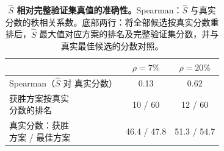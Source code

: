 \begin{table}
\vspace{0pt}
\centering
\caption{\textbf{$\hat{S}$ 相对完整验证集真值的准确性。}Spearman：$\hat{S}$ 与真实分数的秩相关系数。底部两行：将全部候选按真实分数重排后，$\hat{S}$ 最大值对应方案的排名及完整验证集分数，并与真实最佳候选的分数对照。}
\label{table:est_accuracy}
\scriptsize
\setlength{\tabcolsep}{2pt}
\begin{tabular}{lcc}
\toprule
 & $\rho{=}7\%$ & $\rho{=}20\%$ \\
\midrule
\makecell[l]{Spearman（$\hat{S}$ 对\\真实分数）} & 0.13 & 0.62 \\
\makecell[l]{获胜方案按真实\\分数的排名} & 10 / 60 & 12 / 60 \\
\makecell[l]{真实分数：获胜\\方案 / 最佳方案} & 46.4 / 47.8 & 51.3 / 54.7 \\
\bottomrule
\end{tabular}
\vspace{-8pt}
\end{table}
